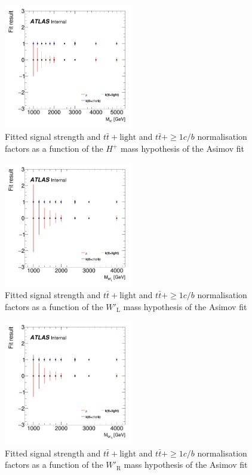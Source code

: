 \begin{figure}[H]
  \centering
  \includegraphics[width=0.50\textwidth]{images/ProfileLHFit/FitResults_Hp.png}
  \caption{Fitted signal strength and $t\bar{t}+\text{light}$ and $t\bar{t}+{\geq}1c/b$ normalisation factors as a function of the $H^{+}$ mass hypothesis of the Asimov fit}
  \label{fig:AsimovFitResultsSummary_Hp}
\end{figure}

\begin{figure}[H]
  \centering
  \includegraphics[width=0.50\textwidth]{images/ProfileLHFit/FitResults_WpLH.png}
  \caption{Fitted signal strength and $t\bar{t}+\text{light}$ and $t\bar{t}+{\geq}1c/b$ normalisation factors as a function of the $W'_{\text{L}}$ mass hypothesis of the Asimov fit}
  \label{fig:AsimovFitResultsSummary_WpLH}
\end{figure}

\begin{figure}[H]
  \centering
  \includegraphics[width=0.50\textwidth]{images/ProfileLHFit/FitResults_WpRH.png}
  \caption{Fitted signal strength and $t\bar{t}+\text{light}$ and $t\bar{t}+{\geq}1c/b$ normalisation factors as a function of the $W'_{\text{R}}$ mass hypothesis of the Asimov fit}
  \label{fig:AsimovFitResultsSummary_WpRH}
\end{figure}


